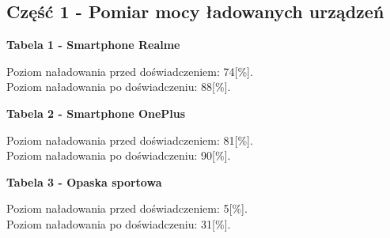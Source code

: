 \documentclass[11pt]{article}
\begin{document}
    \subsection*{Część 1 - Pomiar mocy ładowanych urządzeń}
    \begin{center}
    \textbf{\small Tabela 1 - Smartphone Realme}
    \end{center}
    \begin{center}
    \end{center}
    Poziom naładowania przed doświadczeniem: 74[\%].\\
    Poziom naładowania po doświadczeniu: 88[\%].
    \newpage
    \begin{center}
        \textbf{\small Tabela 2 - Smartphone OnePlus}
    \end{center}
    \begin{center}
    \end{center}
    Poziom naładowania przed doświadczeniem: 81[\%].\\
    Poziom naładowania po doświadczeniu: 90[\%].
    \newpage
    \begin{center}
        \textbf{\small Tabela 3 - Opaska sportowa}
    \end{center}
    \begin{center}
    \end{center}
    Poziom naładowania przed doświadczeniem: 5[\%].\\
    Poziom naładowania po doświadczeniu: 31[\%].
\end{document}
